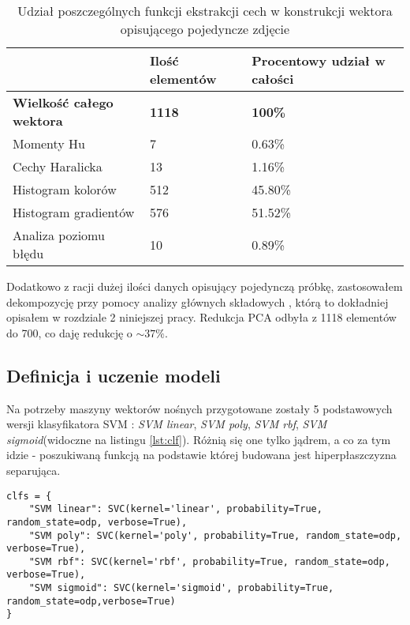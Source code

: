 \begin{table}[h!]
	\centering
	\begin{tabular}{l|l|l|}
		\cline{2-3}
		& Ilość elementów & Procentowy udział w całości \\ \hline
		\multicolumn{1}{|l|}{\textbf{Wielkość całego wektora}} & \textbf{1118} & \textbf{100\%} \\ \hline
		\multicolumn{1}{|l|}{Momenty Hu}            & 7               & 0.63\%                      \\ \hline
		\multicolumn{1}{|l|}{Cechy Haralicka}       & 13              & 1.16\%                      \\ \hline
		\multicolumn{1}{|l|}{Histogram kolorów}     & 512             & 45.80\%                     \\ \hline
		\multicolumn{1}{|l|}{Histogram gradientów}  & 576             & 51.52\%                     \\ \hline
		\multicolumn{1}{|l|}{Analiza poziomu błędu} & 10              & 0.89\%                      \\ \hline
	\end{tabular}
	\caption{Udział poszczególnych funkcji ekstrakcji cech w konstrukcji wektora opisującego pojedyncze zdjęcie}
	\label{tab:pdst}
\end{table}

Dodatkowo z racji dużej ilości danych opisujący pojedynczą próbkę, zastosowałem dekompozycję przy pomocy analizy głównych składowych \cite{pca}, którą to dokładniej opisałem w rozdziale 2 niniejszej pracy.  Redukcja PCA odbyła z 1118 elementów do 700, co daję redukcję o $\sim37\%$.

\subsection{Definicja i uczenie modeli}

Na potrzeby maszyny wektorów nośnych przygotowane zostały 5 podstawowych wersji klasyfikatora SVM \cite{hands_on}: \textit{SVM linear}, \textit{SVM poly}, \textit{SVM rbf}, \textit{SVM sigmoid}(widoczne na listingu \ref{lst:clf}). Różnią się one tylko jądrem, a co za tym idzie - poszukiwaną funkcją na podstawie której budowana jest hiperpłaszczyzna separująca.

\begin{lstlisting}[caption={Możliwe klasyfikactory dla SVM'a}, label={lst:clf}]
clfs = {
	"SVM linear": SVC(kernel='linear', probability=True, random_state=odp, verbose=True),
	"SVM poly": SVC(kernel='poly', probability=True, random_state=odp, verbose=True),
	"SVM rbf": SVC(kernel='rbf', probability=True, random_state=odp, verbose=True),
	"SVM sigmoid": SVC(kernel='sigmoid', probability=True, random_state=odp,verbose=True)
}
\end{lstlisting}

